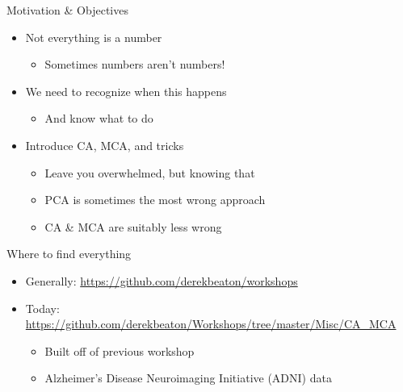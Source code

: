 \documentclass[
  ignorenonframetext,
]{beamer}
\providecommand{\tightlist}{%
  \setlength{\itemsep}{0pt}\setlength{\parskip}{0pt}}
\begin{document}
\begin{frame}{Motivation \& Objectives}
\protect\hypertarget{motivation-objectives}{}

\begin{itemize}[<+->]
\tightlist
\item
  Not everything is a number

  \begin{itemize}[<+->]
  \tightlist
  \item
    Sometimes numbers aren't numbers!
  \end{itemize}
\item
  We need to recognize when this happens

  \begin{itemize}[<+->]
  \tightlist
  \item
    And know what to do
  \end{itemize}
\item
  Introduce CA, MCA, and tricks

  \begin{itemize}[<+->]
  \tightlist
  \item
    Leave you overwhelmed, but knowing that
  \item
    PCA is sometimes the most wrong approach
  \item
    CA \& MCA are suitably less wrong
  \end{itemize}
\end{itemize}

\end{frame}

\begin{frame}{Where to find everything}
\protect\hypertarget{where-to-find-everything}{}

\begin{itemize}[<+->]
\tightlist
\item
  Generally: \url{https://github.com/derekbeaton/workshops}
\item
  Today:
  \url{https://github.com/derekbeaton/Workshops/tree/master/Misc/CA_MCA}

  \begin{itemize}[<+->]
  \tightlist
  \item
    Built off of previous workshop
  \item
    Alzheimer's Disease Neuroimaging Initiative (ADNI) data
  \end{itemize}
\end{itemize}

\end{frame}
\end{document}
